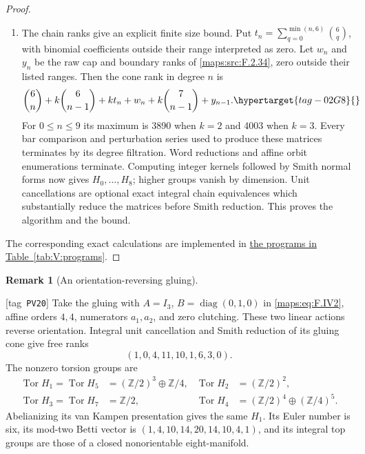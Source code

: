 \documentclass[11pt,a4paper]{article}
\numberwithin{equation}{section}
\theoremstyle{definition}
\newtheorem{remark}[remark]{Remark}
\newcommand{\StatementRecord}[4]{{\upshape\footnotesize[tag~\texttt{#3}]}\enspace\ignorespaces}
\begin{document}
\begin{proof}
\begin{enumerate}[label=\arabic*.]
\item The chain ranks give an explicit finite size bound.  Put
$t_n=\sum_{q=0}^{\min(n,6)}\binom6q$, with binomial
coefficients outside their range interpreted as zero.
Let $w_n$ and $y_n$ be the raw cap and boundary ranks of
\ref{maps:src:F.2.34}, zero outside their listed ranges.  Then the cone rank
in degree $n$ is
\begin{equation}
 \binom6n+k\binom6{n-1}+k t_n+w_n+
 k\binom7{n-1}+y_{n-1}.                                 \hypertarget{tag-02G8}{}\label{maps:eq:F.GC9}
\end{equation}
For $0\leq n\leq9$ its maximum is 3890 when $k=2$ and
4003 when $k=3$.  Every bar comparison and perturbation
series used to produce these matrices terminates by its
degree filtration.  Word reductions and affine orbit enumerations terminate.
Computing integer kernels followed by Smith normal forms
now gives $H_0,\ldots,H_8$; higher groups vanish by dimension.
Unit cancellations are optional exact integral chain
equivalences which substantially reduce the matrices before
Smith reduction.  This proves the algorithm and the bound.
\end{enumerate}
The corresponding exact calculations are implemented in \hyperlink{prog:V:chains}{the programs in Table~\ref*{tab:V:programs}}.
\end{proof}




\begin{remark}[An orientation-reversing gluing]\hypertarget{tag-PV20}{}\label{rem:V:orientation-reversing-gluing}
\StatementRecord{rem:V:orientation-reversing-gluing}{proved}{PV20}{}
Take the gluing with
$A=I_3$, $B=\operatorname{diag}(0,1,0)$ in \eqref{maps:eq:F.IV2},
affine orders $4,4$, numerators $a_1,a_2$, and zero
clutching.  These two linear actions reverse orientation.
Integral unit cancellation and Smith reduction of its gluing cone give free ranks
\[
                  (1,0,4,11,10,1,6,3,0).
\]
The nonzero torsion groups are
\[
\begin{aligned}
 \operatorname{Tor}H_1=\operatorname{Tor}H_5
       &=(\mathbb Z/2)^3\oplus\mathbb Z/4,&
 \operatorname{Tor}H_2&=(\mathbb Z/2)^2,\\
 \operatorname{Tor}H_3=\operatorname{Tor}H_7
       &=\mathbb Z/2,&
 \operatorname{Tor}H_4&=(\mathbb Z/2)^4\oplus(\mathbb Z/4)^5.
\end{aligned}
\]
Abelianizing its van Kampen presentation gives the same $H_1$.  Its Euler number
is six, its mod-two Betti vector is
$(1,4,10,14,20,14,10,4,1)$, and its integral top groups
are those of a closed nonorientable eight-manifold.
\end{remark}
\end{document}
